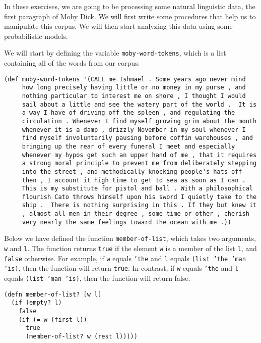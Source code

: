\documentclass[10pt]{article}
\begin{document}
In these exercises, we are going to be processing some natural
linguistic data, the first paragraph of Moby Dick. We will first write
some procedures that help us to manipulate this corpus. We will then
start analyzing this data using some probabilistic models.

We will start by defining the variable \texttt{moby-word-tokens},
which is a list containing all of the words from our corpus.

\begin{lstlisting}
(def moby-word-tokens '(CALL me Ishmael . Some years ago never mind
     how long precisely having little or no money in my purse , and
     nothing particular to interest me on shore , I thought I would
     sail about a little and see the watery part of the world .  It is
     a way I have of driving off the spleen , and regulating the
     circulation . Whenever I find myself growing grim about the mouth
     whenever it is a damp , drizzly November in my soul whenever I
     find myself involuntarily pausing before coffin warehouses , and
     bringing up the rear of every funeral I meet and especially
     whenever my hypos get such an upper hand of me , that it requires
     a strong moral principle to prevent me from deliberately stepping
     into the street , and methodically knocking people's hats off
     then , I account it high time to get to sea as soon as I can .
     This is my substitute for pistol and ball . With a philosophical
     flourish Cato throws himself upon his sword I quietly take to the
     ship .  There is nothing surprising in this . If they but knew it
     , almost all men in their degree , some time or other , cherish
     very nearly the same feelings toward the ocean with me .))
\end{lstlisting}

Below we have defined the function \texttt{member-of-list}, which
takes two arguments, \texttt{w} and \texttt{l}. The function returns
\texttt{true} if the element \texttt{w} is a member of the list
\texttt{l}, and \texttt{false} otherwise. For example, if \texttt{w}
equals \texttt{'the} and \texttt{l} equals \texttt{(list 'the 'man
  'is)}, then the function will return \texttt{true}. In contrast, if
\texttt{w} equals \texttt{'the} and \texttt{l} equals \texttt{(list
  'man 'is)}, then the function will return false.

\begin{lstlisting}
(defn member-of-list? [w l]
  (if (empty? l)
    false
    (if (= w (first l))
      true
      (member-of-list? w (rest l)))))
\end{lstlisting}
\end{document}
